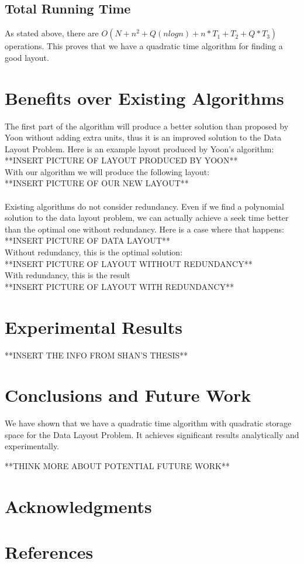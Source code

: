 \documentclass[11pt,psfig]{article}
\begin{document}
\subsection*{Total Running Time}
	As stated above, there are $O(N + n^2 + Q(n logn) + n*T_1 + T_2 + Q*T_3 )$ operations. This proves that we have a quadratic time algorithm for finding a good layout.\\

\section*{Benefits over Existing Algorithms}

The first part of the algorithm will produce a better solution than proposed by Yoon without adding extra units, thus it is an improved solution to the Data Layout Problem. Here is an example layout produced by Yoon's algorithm:\\
**INSERT PICTURE OF LAYOUT PRODUCED BY YOON**\\
With our algorithm we will produce the following layout: \\
**INSERT PICTURE OF OUR NEW LAYOUT**\\
\\
Existing algorithms do not consider redundancy. Even if we find a polynomial solution to the data layout problem, we can actually achieve a seek time better than the optimal one without redundancy. Here is a case where that happens:\\
**INSERT PICTURE OF DATA LAYOUT**\\
Without redundancy, this is the optimal solution:\\
**INSERT PICTURE OF LAYOUT WITHOUT REDUNDANCY**\\
With redundancy, this is the result\\
**INSERT PICTURE OF LAYOUT WITH REDUNDANCY**\\
\section*{Experimental Results}

**INSERT THE INFO FROM SHAN'S THESIS**

\section*{Conclusions and Future Work}

We have shown that we have a quadratic time algorithm with quadratic storage space for the Data Layout Problem. It achieves significant results analytically and experimentally. 

**THINK MORE ABOUT POTENTIAL FUTURE WORK**

\section*{Acknowledgments}

\section*{References}    

\end{document}
